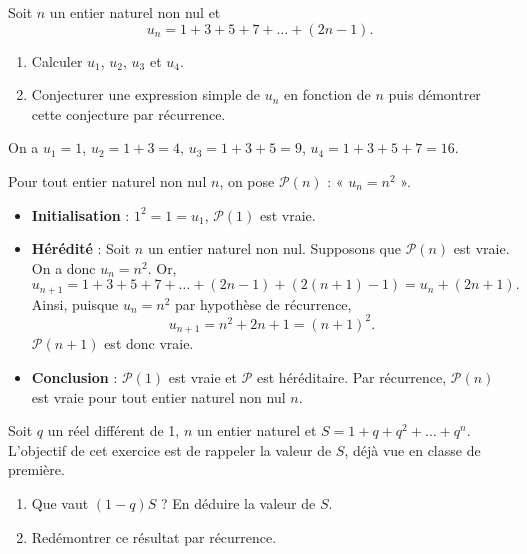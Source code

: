 \documentclass[11pt,fleqn]{book} %
\begin{document}
\begin{exercise}
Soit \(n\) un entier naturel non nul et \[u_n=1+3+5+7+\dots + (2n-1).\]
\begin{enumerate}
 	\item Calculer \(u_1\), \(u_2\), \(u_3\) et \(u_4\).
 	\item Conjecturer une expression simple de \(u_n\) en fonction de \(n\) puis démontrer cette conjecture par récurrence.
\end{enumerate}\end{exercise}
\begin{solution}On a \(u_1=1\), \(u_2=1+3=4\), \(u_3=1+3+5=9\), \(u_4=1+3+5+7=16\).

Pour tout entier naturel non nul \(n\), on pose \(\mathcal{P}(n)\) : « \(u_n=n^2\) ».
\begin{itemize} \item \textbf{Initialisation} : \( 1^2=1=u_1\), \( \mathcal{P}(1) \) est vraie.
\item \textbf{Hérédité} : Soit \(n\) un entier naturel non nul. Supposons que \( \mathcal{P}(n)\) est vraie. On a donc \(u_n=n^2\). Or,
\[u_{n+1}= 1+3+5+7+\dots + (2n-1)+(2(n+1)-1)=u_n + (2n+1).\]
Ainsi, puisque \(u_n=n^2\) par hypothèse de récurrence,
\[u_{n+1}=n^2+2n+1=(n+1)^2.\]\( \mathcal{P}(n+1)\) est donc vraie.
\item \textbf{Conclusion} : \(\mathcal{P}(1)\) est vraie et \(\mathcal{P}\) est héréditaire. Par récurrence, \(\mathcal{P}(n)\) est vraie pour tout entier naturel non nul \(n\).\end{itemize}\end{solution}

\begin{exercise}Soit $q$ un réel différent de 1, $n$ un entier naturel et $S=1+q+q^2+\ldots + q^n$.\\ L'objectif de cet exercice est de rappeler la valeur de $S$, déjà vue en classe de première.
\begin{enumerate}
\item Que vaut $(1-q)S$ ? En déduire la valeur de $S$.
\item Redémontrer ce résultat par récurrence.
\end{enumerate}
\end{exercise}
\end{document}

